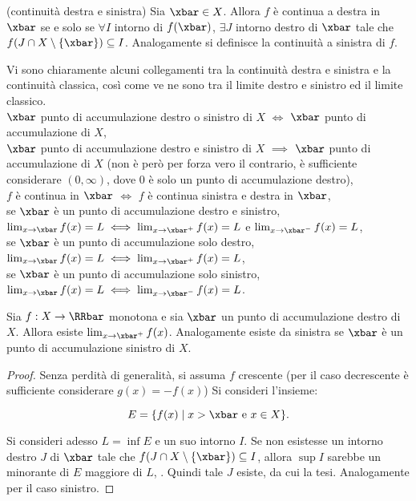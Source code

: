 \documentclass[11pt]{article}
\begin{document}
	\begin{definition}
		(continuità destra e sinistra) Sia $\xbar \in X$. Allora $f$ è continua
		a destra in $\xbar$ se e solo se $\forall I$ intorno di $f(\xbar)$,
		$\exists J$ intorno destro di $\xbar$ tale che $f(J \cap X \setminus \{\xbar\}) \subseteq I$. Analogamente si definisce la continuità
		a sinistra di $f$.
	\end{definition}

	\begin{remark}
		Vi sono chiaramente alcuni collegamenti tra la continuità destra e sinistra e la continuità classica,
		così come ve ne sono tra il limite destro e sinistro ed il limite classico. \\
		
		\li $\xbar$ punto di accumulazione destro o sinistro di $X$ $\iff$ $\xbar$ punto di accumulazione di $X$, \\
		\li $\xbar$ punto di accumulazione destro e sinistro di $X$ $\implies$ $\xbar$ punto di accumulazione di $X$ (non
		è però per forza vero il contrario, è sufficiente considerare $(0, \infty)$, dove $0$ è solo un punto di
		accumulazione destro), \\
		\li $f$ è continua in $\xbar$ $\iff$ $f$ è continua sinistra e destra in $\xbar$, \\
		\li se $\xbar$ è un punto di accumulazione destro e sinistro, $\lim_{x \to \xbar} f(x) = L \iff \lim_{x \to \xbar^+} f(x) = L$ e $\lim_{x \to \xbar^-} f(x) = L$, \\
		\li se $\xbar$ è un punto di accumulazione solo destro, $\lim_{x \to \xbar} f(x) = L \iff \lim_{x \to \xbar^+} f(x) = L$, \\
		\li se $\xbar$ è un punto di accumulazione solo sinistro, $\lim_{x \to \xbar} f(x) = L \iff \lim_{x \to \xbar^-} f(x) = L$.
	\end{remark}
	
	\begin{proposition}
		Sia $f : X \to \RRbar$ monotona e sia $\xbar$ un punto di
		accumulazione destro di $X$. Allora esiste $\lim_{x \to \xbar^+} f(x)$.
		Analogamente esiste da sinistra se $\xbar$ è un punto di
		accumulazione sinistro di $X$.
	\end{proposition}

	\begin{proof}
		Senza perdità di generalità, si assuma $f$ crescente (per il caso decrescente è sufficiente considerare
		$g(x) = -f(x)$) Si consideri l'insieme:
		
		\[E = \{ f(x) \mid x > \xbar \text{ e } x \in X \}.\]
		
		Si consideri adesso $L = \inf E$ e un suo intorno $I$. Se non
		esistesse un intorno destro $J$ di $\xbar$ tale che $f(J \cap X \setminus \{\xbar\}) \subseteq I$, allora
		$\sup I$ sarebbe un minorante di $E$ maggiore di $L$, \Lightning. Quindi tale $J$ esiste, da cui la tesi.
		Analogamente per il caso sinistro.
	\end{proof}
\end{document}
